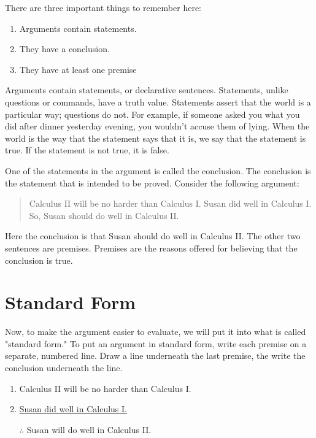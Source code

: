There are three important things to remember here:

\begin{enumerate}
\item Arguments contain statements.
\item They have a conclusion.
\item They have at least one premise
\end{enumerate}

Arguments contain statements, or declarative sentences. Statements,
unlike questions or commands, have a truth value. Statements assert that
the world is a particular way; questions do not. For example, if someone
asked you what you did after dinner yesterday evening, you wouldn't
accuse them of lying. When the world is the way that the statement says
that it is, we say that the statement is true. If the statement is not
true, it is false.

One of the statements in the argument is called the conclusion. The
conclusion is the statement that is intended to be proved. Consider the
following argument:


\begin{quote}
Calculus II will be no harder than Calculus I. Susan did well in
Calculus I. So, Susan should do well in Calculus II.
\end{quote}

Here the conclusion is that Susan should do well in Calculus II. The
other two sentences are premises. Premises are the reasons offered for
believing that the conclusion is true.

\section{Standard Form}
\label{sec:standard-form}

Now, to make the argument easier to evaluate, we will put it into what is called "standard form." To put an argument in standard form, write each premise on a separate, numbered line. Draw a line underneath the last premise, the write the conclusion underneath the line.


\begin{enumerate}
\item Calculus II will be no harder than Calculus I.
\item \underline{Susan did well in Calculus I.}
\item [$\therefore$] Susan will do well in Calculus II.
\end{enumerate}

